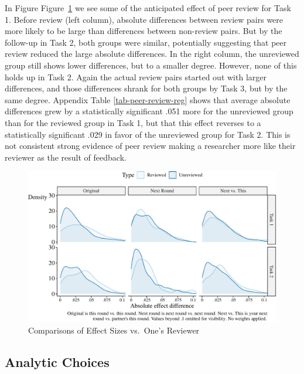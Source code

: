 \documentclass[
  letterpaper,
  DIV=11,
  numbers=noendperiod]{scrartcl}
\begin{document}
In Figure Figure~\ref{fig-like-your-reviewer} we see some of the
anticipated effect of peer review for Task 1. Before review (left
column), absolute differences between review pairs were more likely to
be large than differences between non-review pairs. But by the follow-up
in Task 2, both groups were similar, potentially suggesting that peer
review reduced the large absolute differences. In the right column, the
unreviewed group still shows lower differences, but to a smaller degree.
However, none of this holds up in Task 2. Again the actual review pairs
started out with larger differences, and those differences shrank for
both groups by Task 3, but by the same degree. Appendix Table
\ref{tab-peer-review-reg} shows that average absolute differences grew
by a statistically significant .051 more for the unreviewed group than
for the reviewed group in Task 1, but that this effect reverses to a
statistically significant .029 in favor of the unreviewed group for Task
2. This is not consistent strong evidence of peer review making a
researcher more like their reviewer as the result of feedback.

\begin{figure}

{\centering \includegraphics{The-Sources-of-Researcher-Variation-in-Economics_files/figure-pdf/fig-like-your-reviewer-1.pdf}

}

\caption{\label{fig-like-your-reviewer}Comparisons of Effect Sizes
vs.~One's Reviewer}

\end{figure}

\hypertarget{sec-analytic}{%
\subsection{Analytic Choices}\label{sec-analytic}}
\end{document}
